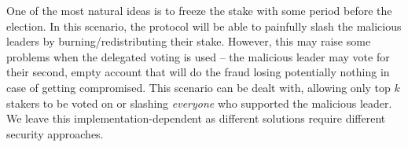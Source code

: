One of the most natural ideas is to freeze the stake with some period before the
election. In this scenario, the protocol will be able to painfully slash the
malicious leaders by burning/redistributing their stake. However, this may raise
some problems when the delegated voting is used – the malicious leader may vote
for their second, empty account that will do the fraud losing potentially
nothing in case of getting compromised. This scenario can be dealt with, allowing only
top $k$ stakers to be voted on or slashing \textit{everyone} who supported the
malicious leader. We leave this implementation-dependent as different solutions
require different security approaches.
